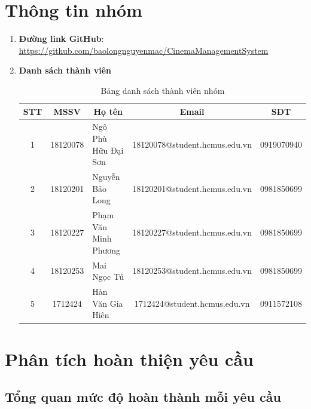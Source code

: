 \documentclass[a4paper, 12pt]{article}
\begin{document}
    \section{Thông tin nhóm}
    \begin{enumerate}
        \item \textbf{Đường link GitHub}: \url{https://github.com/baolongnguyenmac/CinemaManagementSystem}
        \item \textbf{Danh sách thành viên}
        \begin{table}[H]
            \begin{tabular}{|c|c|l|c|c|}
            \hline
            STT & MSSV     & \multicolumn{1}{c|}{Họ tên} & Email                         & SĐT        \\ \hline
            1   & 18120078 & Ngô Phù Hữu Đại Sơn         & 18120078@student.hcmus.edu.vn & 0919070940 \\ \hline
            2   & 18120201 & Nguyễn Bảo Long             & 18120201@student.hcmus.edu.vn & 0981850699 \\ \hline
            3   & 18120227 & Phạm Văn Minh Phương             & 18120227@student.hcmus.edu.vn & 0981850699 \\ \hline
            4   & 18120253 & Mai Ngọc Tú             & 18120253@student.hcmus.edu.vn & 0981850699 \\ \hline
            5   & 1712424 & Hàn Văn Gia Hiên            & 1712424@student.hcmus.edu.vn & 0911572108 \\ \hline
            \end{tabular}
            \caption{Bảng danh sách thành viên nhóm}
        \end{table}
    \end{enumerate}
    \clearpage

    \section{Phân tích hoàn thiện yêu cầu}

    \subsection{Tổng quan mức độ hoàn thành mỗi yêu cầu}
\end{document}
